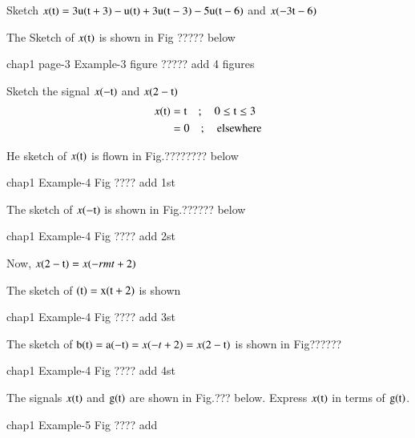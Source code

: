 \begin{exam*}
Sketch $x(\textrm{t})= 3\textrm{u}(\textrm{t}+3)-\textrm{u}(\textrm{t})+ 3\textrm{u}(\textrm{t}-3)-5\textrm{u}(\textrm{t}-6)$ and $x(-3\textrm{t}-6)$
\end{exam*}

\begin{solution}
The Sketch of $x(\textrm{t})$ is shown in Fig ????? below

\begin{center}
chap1 page-3 Example-3 figure ????? add 4 figures
\end{center}
\end{solution}

\begin{exam*}
Sketch the signal $x(-\textrm{t})$ and $x(2-\textrm{t})$
\begin{align*}
x(\textrm{t}) &= \textrm{t} \quad ;\quad 0 \leq \textrm{t} \leq 3\\
        &= 0 \quad ;\quad \text{elsewhere}
\end{align*}
\end{exam*}

\begin{solution}
He sketch of $x(\textrm{t})$ is flown in Fig.???????? below
\begin{center}
chap1 Example-4 Fig ???? add 1st
\end{center}

The sketch of $x(-\textrm{t})$ is shown in Fig.?????? below
\begin{center}
chap1 Example-4 Fig ???? add 2st
\end{center}

Now, $x(2-\textrm{t}) = x(-rmt+2)$

The sketch of $\rm(\textrm{t})=x(\textrm{t}+2)$ is shown 
\begin{center}
chap1 Example-4 Fig ???? add 3st
\end{center}

The sketch of $\textrm{b}(\textrm{t})= \textrm{a}(-\textrm{t}) =x(-t + 2) = x(2-\textrm{t})$ is shown in Fig?????? 
\begin{center}
chap1 Example-4 Fig ???? add 4st
\end{center}
\end{solution}

\begin{exam*}
The signals $x(\textrm{t})$ and $\textrm{g}(\textrm{t})$ are shown in Fig.??? below. Express $x(\textrm{t})$ in terms of $\textrm{g}(\textrm{t})$.
\begin{center}
chap1 Example-5 Fig ???? add 
\end{center}
\end{exam*}

